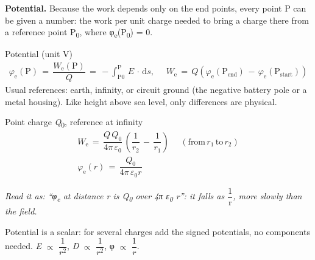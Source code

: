 \documentclass[11pt]{article}
\begin{document}
\begin{keepsection}
\textbf{Potential.} Because the work depends only on the end points, every point P can be given a number: the work per unit charge needed to bring a charge there from a reference point P\textsubscript{0}, where φ\textsubscript{e}(P\textsubscript{0}) = 0.

\begin{equationcard}{Potential (unit V)}
\[ \begin{gathered} φ_{\mathrm{e}}(\mathrm{P})\, =\, \dfrac{{W}_{\mathrm{e}}(\mathrm{P})}{{Q}}\, =\, -\int_{\mathrm{P}0}^{\mathrm{P}} \, {E}\, \cdot \, \mathrm{d}{s},\, \quad \, {W}_{\mathrm{e}}\, =\, {Q}(φ_{\mathrm{e}}(\mathrm{P}_{\text{end}})\, -\, φ_{\mathrm{e}}(\mathrm{P}_{\text{start}})) \end{gathered} \]
{\small Usual references: earth, infinity, or circuit ground (the negative battery pole or a metal housing). Like height above sea level, only differences are physical.}
\end{equationcard}

\begin{equationcard}{Point charge \textit{Q}\textsubscript{0}, reference at infinity}
\[ \begin{gathered} {W}_{\mathrm{e}}\, =\, \dfrac{{Q\,Q}_{0}}{4π\, ε_{0}}\, \left(\dfrac{1}{{r}_{2}}\, -\, \dfrac{1}{{r}_{1}}\right)\, \quad \, (\text{from}\, {r}_{1}\, \text{to}\, {r}_{2}) \\ φ_{\mathrm{e}}({r})\, =\, \dfrac{{Q}_{0}}{4π\, ε_{0}{r}} \end{gathered} \]
{\small \emph{Read it as: “φ\textsubscript{e} at distance r is Q\textsubscript{0} over 4π ε\textsubscript{0} r”: it falls as {\small\ensuremath{\dfrac{1}{\mathrm{r}}}}, more slowly than the field.}\par Potential is a scalar: for several charges add the signed potentials, no components needed. \textit{E} \ensuremath{\propto} {\small\ensuremath{\dfrac{1}{{r}^{2}}}}, \textit{D} \ensuremath{\propto} {\small\ensuremath{\dfrac{1}{{r}^{2}}}}, φ \ensuremath{\propto} {\small\ensuremath{\dfrac{1}{{r}}}}.}
\end{equationcard}


\end{keepsection}
\end{document}
